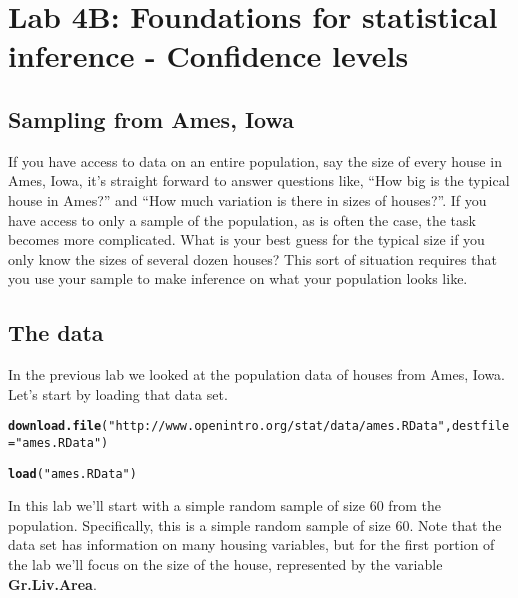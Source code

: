 \documentclass{article}\usepackage[]{graphicx}\usepackage[]{color}
\makeatletter
\newcommand{\hlstr}[1]{\textcolor[rgb]{0.192,0.494,0.8}{#1}}%
\newcommand{\hlstd}[1]{\textcolor[rgb]{0.345,0.345,0.345}{#1}}%
\newcommand{\hlkwc}[1]{\textcolor[rgb]{0.333,0.667,0.333}{#1}}%
\newcommand{\hlkwd}[1]{\textcolor[rgb]{0.737,0.353,0.396}{\textbf{#1}}}%
\newenvironment{kframe}{%
 \def\at@end@of@kframe{}%
 \ifinner\ifhmode%
  \def\at@end@of@kframe{\end{minipage}}%
  \begin{minipage}{\columnwidth}%
 \fi\fi%
 \def\FrameCommand##1{\hskip\@totalleftmargin \hskip-\fboxsep
 \colorbox{shadecolor}{##1}\hskip-\fboxsep
     \hskip-\linewidth \hskip-\@totalleftmargin \hskip\columnwidth}%
 \MakeFramed {\advance\hsize-\width
   \@totalleftmargin\z@ \linewidth\hsize
   \@setminipage}}%
 {\par\unskip\endMakeFramed%
 \at@end@of@kframe}
\newenvironment{knitrout}{}{} %
\makeatother
\begin{document}

\section*{Lab 4B: Foundations for statistical inference - Confidence levels}

\subsection*{Sampling from Ames, Iowa}
If you have access to data on an entire population, say the size of every house in Ames, Iowa, it's straight forward to answer questions like, ``How big is the typical house in Ames?'' and ``How much variation is there in sizes of houses?''. If you have access to only a sample of the population, as is often the case, the task becomes more complicated. What is your best guess for the typical size if you only know the sizes of several dozen houses? This sort of situation requires that you use your sample to make inference on what your population looks like.

\subsection*{The data}

In the previous lab we looked at the population data of houses from Ames, Iowa. Let's start by loading that data set.

\begin{knitrout}
\color{fgcolor}\begin{kframe}
\begin{alltt}
\hlkwd{download.file}\hlstd{(}\hlstr{"http://www.openintro.org/stat/data/ames.RData"}\hlstd{,} \hlkwc{destfile} \hlstd{=} \hlstr{"ames.RData"}\hlstd{)}

\hlkwd{load}\hlstd{(}\hlstr{"ames.RData"}\hlstd{)}
\end{alltt}
\end{kframe}
\end{knitrout}


In this lab we'll start with a simple random sample of size 60 from the population. Specifically, this is a simple random sample of size 60. Note that the data set has information on many housing variables, but for the first portion of the lab we'll focus on the size of the house, represented by the variable \hlkwd{Gr.Liv.Area}.
\end{document}
